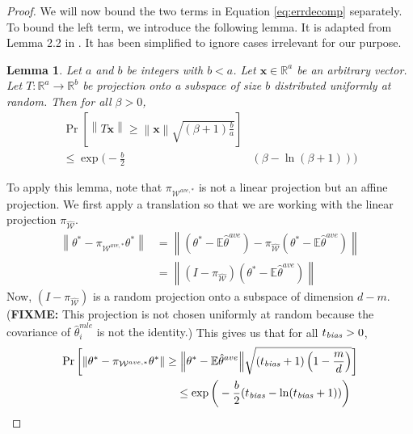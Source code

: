 \documentclass[twoside]{article}
\newtheorem{lemma}{Lemma}
\newcommand{\W}{\mathcal{\hat W}}
\newcommand{\Wtave}{{\mathcal{W}^{ave,*}}}
\newcommand{\E}{\mathbb{E}}
\newcommand{\x}{\mathbf{x}}
\newcommand{\w}{\theta}
\newcommand{\wtave}{\E\hat\w^{ave}}
\newcommand{\wmle}{\hat\w^{mle}}
\newcommand{\wstar}{{\w^{*}}}
\newcommand{\tbias}{t_{\text{\textit{bias}}}}
\newcommand{\ltwo}[1]{{\left\lVert {#1} \right\rVert}}
\newcommand{\proj}[1]{\pi_{{#1}}}
\newcommand{\prob}[1]{\Pr\left[{#1}\right]}
\newcommand{\fixme}[1]{\textbf{FIXME:} {#1}}
\begin{document}
\begin{proof}
{We will now bound the two terms in Equation \ref{eq:errdecomp} separately.
To bound the left term, we introduce the following lemma.
It is adapted from Lemma 2.2 in \cite{dasgupta2003elementary}.
It has been simplified to ignore cases irrelevant for our purpose.
\begin{lemma}
Let $a$ and $b$ be integers with $b<a$.
Let $\x\in\mathbb{R}^a$ be an arbitrary vector.
Let $T : \mathbb{R}^a \to \mathbb{R}^b$ be projection onto a subspace of size $b$ distributed uniformly at random.
Then for all $\beta>0$,
\begin{equation}
\begin{split}
\prob{\ltwo{T\x} \ge \ltwo\x\sqrt{(\beta + 1)\frac{b}{a}}}&
\\
\le
\exp \bigg(-\frac{b}{2} & (\beta-\ln(\beta+1))\bigg)
\end{split}
\end{equation}
\end{lemma}
To apply this lemma, note that $\proj\Wtave$ is not a linear projection but an affine projection.
We first apply a translation so that we are working with the linear projection $\proj\W$.
\begin{align}
\ltwo{\wstar-\proj\Wtave\wstar}
&=
\ltwo{(\wstar-\wtave)-\proj\W(\wstar-\wtave)}
\\
&=
\ltwo{(I-\proj\W)(\wstar-\wtave)}
\end{align}
Now, $(I-\proj\W)$ is a random projection onto a subspace of dimension $d-m$.
(\fixme{This projection is not chosen uniformly at random because the covariance of $\wmle_i$ is not the identity.})
This gives us that for all $\tbias>0$,
\begin{equation}
\begin{split}
\prob{\ltwo{\wstar-\proj\Wtave\wstar} \ge \ltwo{\wstar-\wtave}\sqrt{(\tbias + 1)\left(1-\frac{m}{d}\right)}}&
\\
\le
\exp \bigg(-\frac{b}{2} (\tbias-\ln(\tbias+1))\bigg)~~&
\end{split}
\end{equation}
}

\end{proof}

\end{document}
